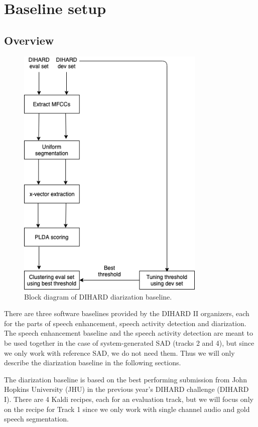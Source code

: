 \chapter{Baseline setup}

\section{Overview}

\begin{figure}[h]
	\includegraphics[width=9cm]{figures/baseline.png}
	\centering
	\caption{Block diagram of DIHARD diarization baseline.}
	\label{fig:fig-baseline}
\end{figure}

There are three software baselines provided by the DIHARD II organizers, each for the parts of speech enhancement, speech activity detection and diarization. The speech enhancement baseline and the speech activity detection are meant to be used together in the case of system-generated SAD (tracks 2 and 4), but since we only work with reference SAD, we do not need them. Thus we will only describe the diarization baseline in the following sections.

The diarization baseline is based on the best performing submission \cite{sell2018diarization} from John Hopkins University (JHU) in the previous year's DIHARD challenge (DIHARD I). There are 4 Kaldi recipes, each for an evaluation track, but we will focus only on the recipe for Track 1 since we only work with single channel audio and gold speech segmentation.

